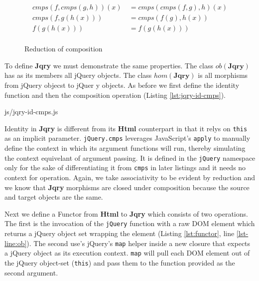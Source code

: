 \documentclass[preprint]{sigplanconf}
\begin{document}
\begin{figure}
\begin{displaymath}
\begin{aligned}
cmps(f,cmps(g,h))(x)\ &= cmps(cmps(f,g),h)(x) \\
cmps(f,g(h(x)))\ &= cmps(f(g),h(x)) \\
f(g(h(x)))\ &= f(g(h(x)))\\
\end{aligned}
\end{displaymath}
\nocaptionrule \caption{Reduction of composition}
\label{fig:html-associativity}
\end{figure}

To define \textbf{Jqry} we must demonstrate the same properties. The class \begin{math}ob(\mathbf{Jqry})\end{math} has as its members all jQuery objects. The class \begin{math}hom(\mathbf{Jqry})\end{math} is all morphisms from jQuery objecst to jQuer y objects. As before we first define the identity function and then the composition operation (Listing \ref{lst:jqry-id-cmps}).

\begin{lstinputlisting}[
    language=JavaScript,
    caption={Identity and Composition in Jqry},
    label={lst:jqry-id-cmps},
    escapeinside={@}{@}
]{js/jqry-id-cmps.js}
\end{lstinputlisting}

Identity in \textbf{Jqry} is different from its \textbf{Html} counterpart in that it relys on \verb|this| as an implicit parameter. \verb|jQuery.cmps| leverages JavaScript's \verb|apply| to manually define the context in which its argument functions will run, thereby simulating the context equivelant of argument passing. It is defined in the \verb|jQuery| namespace only for the sake of differentiating it from \verb|cmps| in later listings and it needs no context for operation. Again, we take associativity to be evident by reduction and we know that \textbf{Jqry} morphisms are closed under composition because the source and target objects are the same.

Next we define a Functor from \textbf{Html} to \textbf{Jqry} which consists of two operations. The first is the invocation of the \verb|jQuery| function with a raw DOM element which returns a jQuery object set wrapping the element (Listing \ref{lst:functor}, line \ref{lst-line:ob}). The second use's jQuery's \verb|map| helper inside a new closure that expects a jQuery object as its execution context. \verb|map| will pull each DOM element out of the jQuery object-set (\verb|this|) and pass them to the function provided as the second argument.
\end{document}
